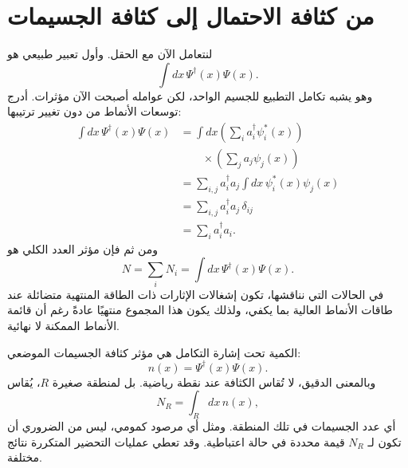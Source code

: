 \begin{classroomqa}
\end{classroomqa}

\section{من كثافة الاحتمال إلى كثافة الجسيمات}

لنتعامل الآن مع الحقل. وأول تعبير طبيعي هو
\begin{equation}
\int dx\,\Psi^\dagger(x)\Psi(x).
\end{equation}
وهو يشبه تكامل التطبيع للجسيم الواحد، لكن عوامله أصبحت الآن مؤثرات. أدرج توسعات الأنماط من دون تغيير ترتيبها:
\begin{align}
\int dx\,\Psi^\dagger(x)\Psi(x)
&=\int dx
\left(\sum_i a_i^\dagger\psi_i^*(x)\right)\\
&\qquad\times\left(\sum_j a_j\psi_j(x)\right) \\
&=\sum_{i,j}a_i^\dagger a_j
\int dx\,\psi_i^*(x)\psi_j(x) \\
&=\sum_{i,j}a_i^\dagger a_j\,\delta_{ij} \\
&=\sum_i a_i^\dagger a_i.
\label{eq:l07-number-derivation}
\end{align}
ومن ثم فإن مؤثر العدد الكلي هو
\begin{equation}
N=\sum_i N_i
=\int dx\,\Psi^\dagger(x)\Psi(x).
\label{eq:l07-total-number}
\end{equation}
في الحالات التي نناقشها، تكون إشغالات الإثارات ذات الطاقة المنتهية متضائلة عند طاقات الأنماط العالية بما يكفي، ولذلك يكون هذا المجموع منتهيًا عادةً رغم أن قائمة الأنماط الممكنة لا نهائية.

الكمية تحت إشارة التكامل هي مؤثر كثافة الجسيمات الموضعي:
\begin{equation}
n(x)=\Psi^\dagger(x)\Psi(x).
\label{eq:l07-density}
\end{equation}
وبالمعنى الدقيق، لا تُقاس الكثافة عند نقطة رياضية. بل لمنطقة صغيرة \(R\)، يُقاس
\begin{equation}
N_R=\int_R dx\,n(x),
\label{eq:l07-regional-number}
\end{equation}
أي عدد الجسيمات في تلك المنطقة. ومثل أي مرصود كمومي، ليس من الضروري أن تكون لـ \(N_R\) قيمة محددة في حالة اعتباطية. وقد تعطي عمليات التحضير المتكررة نتائج مختلفة.

